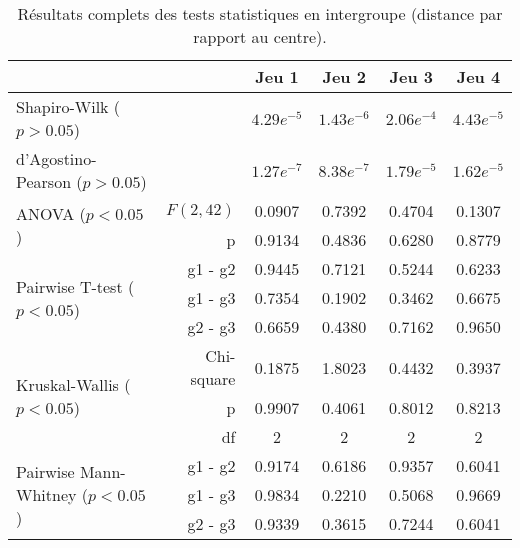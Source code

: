 \begin{table}[H]
\centering
\begin{tabular}{lr|cccc}
 &  & Jeu 1 & Jeu 2 & Jeu 3 & Jeu 4 \\\hline
Shapiro-Wilk ($p > 0.05$) &  & $4.29e^{-5}$ & $1.43e^{-6}$ & $2.06e^{-4}$ & $4.43e^{-5}$  \\
d'Agostino-Pearson ($p > 0.05$) &  &  $1.27e^{-7}$ & $8.38e^{-7}$ & $1.79e^{-5}$ & $1.62e^{-5}$  \\\hline
\multirow{2}{*}{ANOVA ($p < 0.05$)} & $F(2, 42)$ & 0.0907 & 0.7392 & 0.4704 & 0.1307 \\
 & p & 0.9134 & 0.4836 & 0.6280 & 0.8779 \\\hline
\multirow{3}{*}{Pairwise T-test ($p < 0.05$)} & g1 - g2 & 0.9445 & 0.7121 & 0.5244 & 0.6233 \\
 & g1 - g3 & 0.7354 & 0.1902 & 0.3462 & 0.6675 \\
 & g2 - g3 & 0.6659 & 0.4380 & 0.7162 & 0.9650 \\\hline
\multirow{3}{*}{Kruskal-Wallis ($p < 0.05$)} & Chi-square & 0.1875 & 1.8023 & 0.4432 & 0.3937 \\
 & p & 0.9907 & 0.4061 & 0.8012 & 0.8213 \\
 & df & 2 & 2 & 2 & 2 \\\hline
\multirow{3}{*}{Pairwise Mann-Whitney ($p < 0.05$)} & g1 - g2 & 0.9174 & 0.6186 & 0.9357 & 0.6041 \\
 & g1 - g3 & 0.9834 & 0.2210 & 0.5068 & 0.9669 \\
 & g2 - g3 & 0.9339 & 0.3615 & 0.7244 & 0.6041
\end{tabular}
\caption{Résultats complets des tests statistiques en intergroupe (distance par rapport au centre).}
\end{table}

